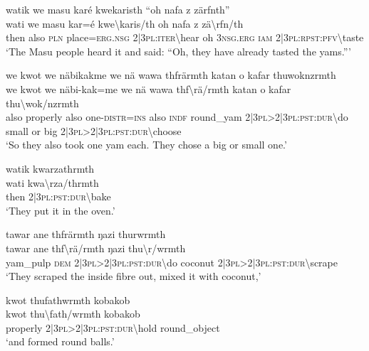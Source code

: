 \ea\label{ex:1:a3827}
watik we masu karé kwekaristh ``oh nafa z zärfnth''\\
\gll wati	we	masu	kar=é	kwe{\textbackslash}karis/th	oh	nafa	z	zä{\textbackslash}rfn/th\\
     then	also	\textsc{pln}	place=\textsc{erg}.\textsc{nsg}	2|3\textsc{pl}:\textsc{iter}{\textbackslash}hear	oh	3\textsc{nsg}.\textsc{erg}	\textsc{iam}	2|3\textsc{pl}:\textsc{rpst}:\textsc{pfv}{\textbackslash}taste\\
\glt `The Masu people heard it and said: ``Oh, they have already tasted the yams.'''
\z

\ea\label{ex:1:a3828}
we kwot we näbikakme we nä wawa thfrärmth katan o kafar thuwoknzrmth\\
\gll we	kwot	we	näbi-kak=me	we	nä	wawa	thf{\textbackslash}rä/rmth	katan	o	kafar	thu{\textbackslash}wok/nzrmth\\
     also	properly	also	one-\textsc{distr}=\textsc{ins}	also	\textsc{indf}	round\_yam	2|3\textsc{pl}>2|3\textsc{pl}:\textsc{pst}:\textsc{dur}{\textbackslash}do	small	or	big	2|3\textsc{pl}>2|3\textsc{pl}:\textsc{pst}:\textsc{dur}{\textbackslash}choose\\
\glt `So they also took one yam each. They chose a big or small one.'
\z

\ea\label{ex:1:a3830}
watik kwarzathrmth\\
\gll wati	kwa{\textbackslash}rza/thrmth\\
     then	2|3\textsc{pl}:\textsc{pst}:\textsc{dur}{\textbackslash}bake\\
\glt `They put it in the oven.'
\z

\ea\label{ex:1:a3831}
tawar ane thfrärmth ŋazi thurwrmth\\
\gll tawar	ane	thf{\textbackslash}rä/rmth	ŋazi	thu{\textbackslash}r/wrmth\\
     yam\_pulp	\textsc{dem}	2|3\textsc{pl}>2|3\textsc{pl}:\textsc{pst}:\textsc{dur}{\textbackslash}do	coconut	2|3\textsc{pl}>2|3\textsc{pl}:\textsc{pst}:\textsc{dur}{\textbackslash}scrape\\
\glt `They scraped the inside fibre out, mixed it with coconut,'
\z

\newpage
\ea\label{ex:1:a3832}
kwot thufathwrmth kobakob\\
\gll kwot	thu{\textbackslash}fath/wrmth	kobakob\\
     properly	2|3\textsc{pl}>2|3\textsc{pl}:\textsc{pst}:\textsc{dur}{\textbackslash}hold	round\_object\\
\glt `and formed round balls.'
\z

